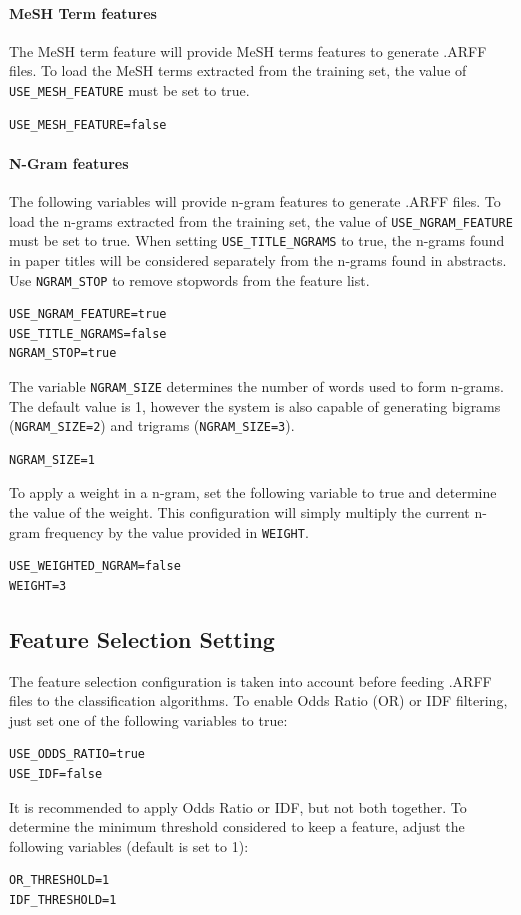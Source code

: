 \documentclass[11pt]{article}
\begin{document}
\paragraph{MeSH Term features}
The MeSH term feature will provide MeSH terms features to generate .ARFF files.
To load the MeSH terms extracted from the training set, the value of \texttt{USE\_MESH\_FEATURE} must be set to true.
\begin{lstlisting}
USE_MESH_FEATURE=false
\end{lstlisting}

\paragraph{N-Gram features}
The following variables will provide n-gram features to generate .ARFF files.
To load the n-grams extracted from the training set, the value of \texttt{USE\_NGRAM\_FEATURE} must be set to true.
When setting \texttt{USE\_TITLE\_NGRAMS} to true, the n-grams found in paper titles will be 
considered separately from the n-grams found in abstracts.
Use \texttt{NGRAM\_STOP} to remove stopwords from the feature list.
\begin{lstlisting}
USE_NGRAM_FEATURE=true
USE_TITLE_NGRAMS=false
NGRAM_STOP=true
\end{lstlisting}
The variable \texttt{NGRAM\_SIZE} determines the number of words used to
form n-grams. The default value is 1, however the system is also capable of generating 
bigrams (\texttt{NGRAM\_SIZE=2}) and trigrams (\texttt{NGRAM\_SIZE=3}). 
\begin{lstlisting}
NGRAM_SIZE=1
\end{lstlisting}

To apply a weight in a n-gram, set the following variable to true and
determine the value of the weight.
This configuration will simply multiply the current n-gram frequency by the value provided in \texttt{WEIGHT}.
\begin{lstlisting}
USE_WEIGHTED_NGRAM=false
WEIGHT=3
\end{lstlisting}

\subsection{Feature Selection Setting}
\label{subsec:featselec}
The feature selection configuration is taken into account before feeding .ARFF files to the classification algorithms.
To enable Odds Ratio (OR) or IDF filtering, just set one of the following variables to true:
\begin{lstlisting}
USE_ODDS_RATIO=true
USE_IDF=false
\end{lstlisting}
It is recommended to apply Odds Ratio or IDF, but not both together.
To determine the minimum threshold considered to keep a feature, adjust the following variables (default is set to 1):
\begin{lstlisting}
OR_THRESHOLD=1
IDF_THRESHOLD=1
\end{lstlisting}
\end{document}

